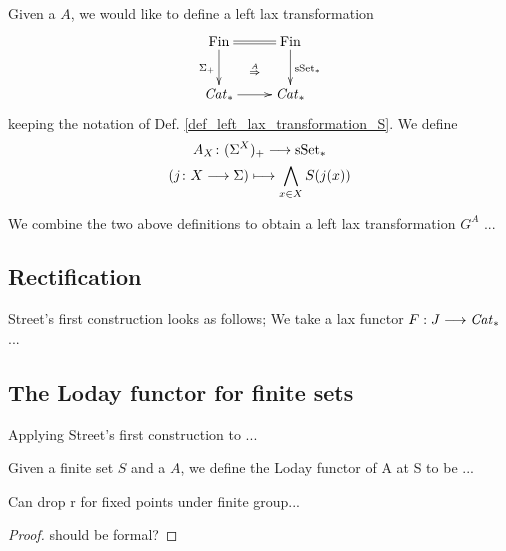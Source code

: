     \begin{defn}\label{def_left_lax_transformation_A}
      Given a \hring $A$, we would like to define a left lax transformation
      \begin{displaymath}
        \xymatrix{
          \Fin 
            \ar@{=}[r] 
            \ar[d]_{\Sigma_+} 
            \ar@{}[rd]|{\overset{A}{\Rightarrow}} 
          & 
          \Fin \ar[d]^{\sS_*} \\
          \Cat_* \ar[r] & \Cat_*
        }
      \end{displaymath}
      keeping the notation of Def. \ref{def_left_lax_transformation_S}. We define
      \begin{gather*}
        A_X \colon (\Sigma^X)_+ \longrightarrow \mathrm{sSet}_* \\
        (j \colon X \longrightarrow \Sigma) \longmapsto \bigwedge_{x \in X} S(j(x))
      \end{gather*}
    \end{defn}

    \begin{defn}\label{def_left_lax_transform_G^A}
      We combine the two above definitions to obtain a left lax transformation $G^A$ ...
    \end{defn}

  \subsection{Rectification}

    \begin{defn}\label{def_streets_first_construction}
      Street's first construction looks as follows; We take a lax functor $F: J \longrightarrow \mathit{Cat}_*$ ...
    \end{defn}

  \subsection{The Loday functor for finite sets}
    \begin{defn}\label{def_rectification_of_G^A}
      Applying Street's first construction to ...
    \end{defn}

    \begin{defn}\label{def_loday_functor_finite_sets}
      Given a finite set $S$ and a \hring $A$, we define the Loday functor of A at S to be ...
    \end{defn}

    \begin{lem}\label{lem_loday_functor_fixed_points}
      Can drop r for fixed points under finite group...
      \begin{proof}
        should be formal?
      \end{proof}
    \end{lem}

